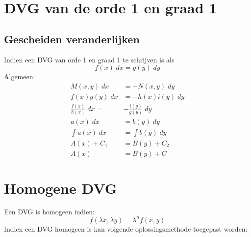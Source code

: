 \section{DVG van de orde 1 en graad 1}
\subsection{Gescheiden veranderlijken}
Indien een DVG van orde 1 en graad 1 te schrijven is als
$$f(x)\;dx = g(y)\;dy$$
Algemeen:
\begin{equation*}
 \begin{split}
  M(x, y)\;dx & = -N(x, y)\; dy \\
  f(x)g(y)\;dx & = -h(x)i(y)\; dy \\
  \frac{f(x)}{h(x)}\; dx = & -\frac{i(y)}{g(y)}\;dy \\
  a(x) \; dx & = b(y)\; dy \\
  \int a(x) \; dx & = \int b(y) \; dy \\
  A(x) + C_1 & = B(y) + C_2 \\
  A(x) & = B(y) + C
 \end{split}
\end{equation*}

\section{Homogene DVG}
Een DVG is homogeen indien:
$$f(\lambda x, \lambda y) = \lambda^n f(x,y)$$
Indien een DVG homogeen is kan volgende oplossingsmethode toegepast worden:

